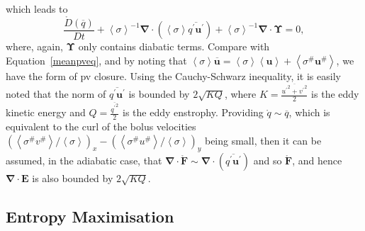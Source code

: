 \documentclass[12pt,a4paper]{report}
\newcommand*\thkmean[1]{\overline{#1}}
\newcommand*\thkres[1]{{#1}^{\prime}}
\newcommand*\nthkmean[1]{\left\langle{#1}\right\rangle}
\newcommand*\nthkres[1]{{#1}^{\#}}
\newcommand*\spec[1]{\mathring{#1}}
\newcommand*\equref[1]{Equation~\eqref{#1}}
\begin{document}
                      which leads  to
                      \begin{equation}
                      \frac{\spec{D} \left( \thkmean{q}\right)}{D t}
                      + \nthkmean{\sigma}^{-1}\boldsymbol{\nabla}\cdot\left(\nthkmean{\sigma}\thkmean{\thkres{q} \thkres{\boldsymbol{u}}}\right)
                      +\nthkmean{\sigma}^{-1}\boldsymbol{\nabla}\cdot\boldsymbol{\Upsilon}=0 ,
                      \end{equation}
                      where, again, $\boldsymbol{\Upsilon}$ only contains
                      diabatic terms. Compare with \equref{meanpveq}, and by noting that
                       ${\nthkmean{\sigma}\thkmean{\boldsymbol{u}}=\nthkmean{\sigma}\nthkmean{\boldsymbol{u}} + \nthkmean{\nthkres{\sigma}\nthkres{\boldsymbol{u}}}}$, we have the 
                       \cite{greatbatch1998exploring} form of \gls{pv} closure.
                       Using the Cauchy-Schwarz inequality, it is easily noted that
                       the norm of $\thkmean{\thkres{q} \thkres{\boldsymbol{u}}}$ is bounded
                       by $2\sqrt{KQ}$, where $K = \frac{\thkmean{{\thkres{u}}^{2} +
                       	{\thkres{v}}^{2}}}{2}$ is the eddy kinetic energy and $Q =
                        \frac{\thkmean{{\thkres{q}}^{2}}}{2}$ is the eddy enstrophy.
                       Providing $\spec{q} \sim \thkmean{q}$, which is equivalent 
                       to the  curl of the bolus velocities $\left(\nthkmean{\nthkres{\sigma}\nthkres{v}}/\nthkmean{\sigma}\right)_{x}-\left(\nthkmean{\nthkres{\sigma}\nthkres{u}}/\nthkmean{\sigma}\right)_{y}$ 
                       being small, then it can be assumed, in the adiabatic case,
                       that $\boldsymbol{\nabla}\cdot\spec{\boldsymbol{F}} \sim \boldsymbol{\nabla}\cdot\left(\thkmean{\thkres{q} \thkres{\boldsymbol{u}}}\right)$ and so $\spec{\boldsymbol{F}}$,
                       and hence $\boldsymbol{\nabla}\cdot\boldsymbol{E}$
                       is also bounded by  $2\sqrt{KQ}$.
                       
                       
                      
                      
                      
                      
                      
                      \subsection{Entropy  Maximisation}
                      \label{entropy}
                     
\end{document}
